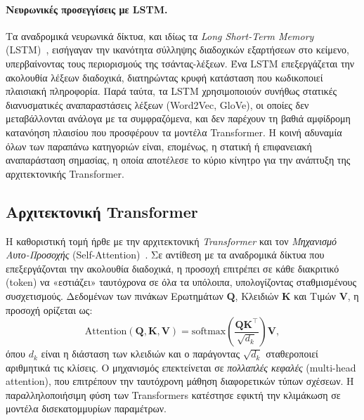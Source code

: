 \paragraph{Νευρωνικές προσεγγίσεις με LSTM.}
Τα αναδρομικά νευρωνικά δίκτυα, και ιδίως τα \emph{Long Short-Term Memory}
(LSTM)~\cite{hochreiter1997lstm}, εισήγαγαν την ικανότητα σύλληψης διαδοχικών
εξαρτήσεων στο κείμενο, υπερβαίνοντας τους περιορισμούς της τσάντας-λέξεων.
Ένα LSTM επεξεργάζεται την ακολουθία λέξεων διαδοχικά, διατηρώντας κρυφή
κατάσταση που κωδικοποιεί πλαισιακή πληροφορία. Παρά ταύτα, τα LSTM
χρησιμοποιούν συνήθως στατικές διανυσματικές αναπαραστάσεις λέξεων (Word2Vec,
GloVe), οι οποίες δεν μεταβάλλονται ανάλογα με τα συμφραζόμενα, και δεν
παρέχουν τη βαθιά αμφίδρομη κατανόηση πλαισίου που προσφέρουν τα μοντέλα
Transformer. Η κοινή αδυναμία όλων των παραπάνω κατηγοριών είναι, επομένως, η
στατική ή επιφανειακή αναπαράσταση σημασίας, η οποία αποτέλεσε το κύριο κίνητρο
για την ανάπτυξη της αρχιτεκτονικής Transformer.


\subsection{Αρχιτεκτονική Transformer}
\label{subsec:transformer}

Η καθοριστική τομή ήρθε με την αρχιτεκτονική \emph{Transformer} και τον
\emph{Μηχανισμό Αυτο-Προσοχής} (Self-Attention)~\cite{vaswani2017attention}.
Σε αντίθεση με τα αναδρομικά δίκτυα που επεξεργάζονται την ακολουθία διαδοχικά,
η προσοχή επιτρέπει σε κάθε διακριτικό (token) να
«εστιάζει» ταυτόχρονα σε όλα τα υπόλοιπα, υπολογίζοντας σταθμισμένους
συσχετισμούς. Δεδομένων των πινάκων Ερωτημάτων $\mathbf{Q}$, Κλειδιών
$\mathbf{K}$ και Τιμών $\mathbf{V}$, η προσοχή ορίζεται ως:
\begin{equation}
    \mathrm{Attention}(\mathbf{Q}, \mathbf{K}, \mathbf{V}) =
    \mathrm{softmax}\!\left(
    \frac{\mathbf{Q}\mathbf{K}^{\top}}{\sqrt{d_k}}
    \right)\mathbf{V},
    \label{eq:attention}
\end{equation}
όπου $d_k$ είναι η διάσταση των κλειδιών και ο παράγοντας $\sqrt{d_k}$
σταθεροποιεί αριθμητικά τις κλίσεις. Ο μηχανισμός επεκτείνεται σε
\emph{πολλαπλές κεφαλές} (multi-head attention),
που επιτρέπουν την ταυτόχρονη μάθηση διαφορετικών τύπων σχέσεων. Η
παραλληλοποιήσιμη φύση των Transformers κατέστησε εφικτή την κλιμάκωση σε
μοντέλα δισεκατομμυρίων παραμέτρων.

